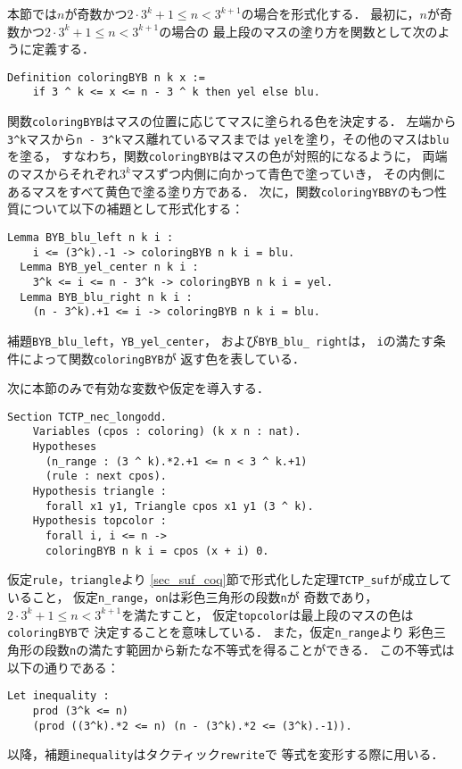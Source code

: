 本節では$n$が奇数かつ$2 \cdot 3^{k} + 1 \leq n < 3^{k+1}$の場合を形式化する．
最初に，$n$が奇数かつ$2 \cdot 3^{k} + 1 \leq n < 3^{k+1}$の場合の
最上段のマスの塗り方を関数として次のように定義する．
\begin{lstlisting}[language=Coq]
  Definition coloringBYB n k x :=
    if 3 ^ k <= x <= n - 3 ^ k then yel else blu.
\end{lstlisting}
関数{\tt{coloringBYB}}はマスの位置に応じてマスに塗られる色を決定する．
左端から{\tt{3\verb|^|k}}マスから{\tt{n - 3\verb|^|k}}マス離れているマスまでは
{\tt{yel}}を塗り，その他のマスは{\tt{blu}}を塗る，
すなわち，関数{\tt{coloringBYB}}はマスの色が対照的になるように，
両端のマスからそれぞれ$3^k$マスずつ内側に向かって青色で塗っていき，
その内側にあるマスをすべて黄色で塗る塗り方である．
次に，関数{\tt{coloringYBBY}}のもつ性質について以下の補題として形式化する：
\begin{lstlisting}[language=Coq]
  Lemma BYB_blu_left n k i :
    i <= (3^k).-1 -> coloringBYB n k i = blu.
  Lemma BYB_yel_center n k i :
    3^k <= i <= n - 3^k -> coloringBYB n k i = yel.
  Lemma BYB_blu_right n k i :
    (n - 3^k).+1 <= i -> coloringBYB n k i = blu.
\end{lstlisting}
補題{\tt{BYB\_blu\_left}}，{\tt{YB\_yel\_center}}，
および{\tt{BYB\_blu\_ right}}は，
{\tt{i}}の満たす条件によって関数{\tt{coloringBYB}}が
返す色を表している．

次に本節のみで有効な変数や仮定を導入する．
\begin{lstlisting}[language=Coq]
  Section TCTP_nec_longodd.
    Variables (cpos : coloring) (k x n : nat).
    Hypotheses
      (n_range : (3 ^ k).*2.+1 <= n < 3 ^ k.+1)
      (rule : next cpos).
    Hypothesis triangle :
      forall x1 y1, Triangle cpos x1 y1 (3 ^ k).
    Hypothesis topcolor :
      forall i, i <= n ->
      coloringBYB n k i = cpos (x + i) 0.
\end{lstlisting}
仮定{\tt{rule}}，{\tt{triangle}}より
\ref{sec_suf_coq}節で形式化した定理{\tt{TCTP\_suf}}が成立していること，
仮定{\tt{n\_range}}，{\tt{on}}は彩色三角形の段数{\tt{n}}が
奇数であり，$2 \cdot 3^{k} + 1 \leq n < 3^{k+1}$を満たすこと，
仮定{\tt{topcolor}}は最上段のマスの色は{\tt{coloringBYB}}で
決定することを意味している．
また，仮定{\tt{n\_range}}より
彩色三角形の段数{\tt{n}}の満たす範囲から新たな不等式を得ることができる．
この不等式は以下の通りである：
\begin{lstlisting}[language=Coq]
  Let inequality :
    prod (3^k <= n)
    (prod ((3^k).*2 <= n) (n - (3^k).*2 <= (3^k).-1)).
\end{lstlisting}
以降，補題{\tt{inequality}}はタクティック{\tt{rewrite}}で
等式を変形する際に用いる．

